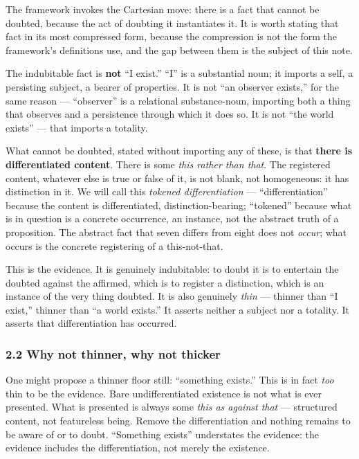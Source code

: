 \documentclass[
]{article}
\begin{document}
The framework invokes the Cartesian move: there is a fact that cannot be
doubted, because the act of doubting it instantiates it. It is worth
stating that fact in its most compressed form, because the compression
is not the form the framework's definitions use, and the gap between
them is the subject of this note.

The indubitable fact is \textbf{not} ``I exist.'' ``I'' is a substantial
noun; it imports a self, a persisting subject, a bearer of properties.
It is not ``an observer exists,'' for the same reason --- ``observer''
is a relational substance-noun, importing both a thing that observes and
a persistence through which it does so. It is not ``the world exists''
--- that imports a totality.

What cannot be doubted, stated without importing any of these, is that
\textbf{there is differentiated content}. There is some \emph{this
rather than that}. The registered content, whatever else is true or
false of it, is not blank, not homogeneous: it has distinction in it. We
will call this \emph{tokened differentiation} --- ``differentiation''
because the content is differentiated, distinction-bearing; ``tokened''
because what is in question is a concrete occurrence, an instance, not
the abstract truth of a proposition. The abstract fact that seven
differs from eight does not \emph{occur}; what occurs is the concrete
registering of a this-not-that.

This is the evidence. It is genuinely indubitable: to doubt it is to
entertain the doubted against the affirmed, which is to register a
distinction, which is an instance of the very thing doubted. It is also
genuinely \emph{thin} --- thinner than ``I exist,'' thinner than ``a
world exists.'' It asserts neither a subject nor a totality. It asserts
that differentiation has occurred.

\hypertarget{why-not-thinner-why-not-thicker}{%
\subsubsection{2.2 Why not thinner, why not
thicker}\label{why-not-thinner-why-not-thicker}}

One might propose a thinner floor still: ``something exists.'' This is
in fact \emph{too} thin to be the evidence. Bare undifferentiated
existence is not what is ever presented. What is presented is always
some \emph{this as against that} --- structured content, not featureless
being. Remove the differentiation and nothing remains to be aware of or
to doubt. ``Something exists'' understates the evidence: the evidence
includes the differentiation, not merely the existence.
\end{document}
